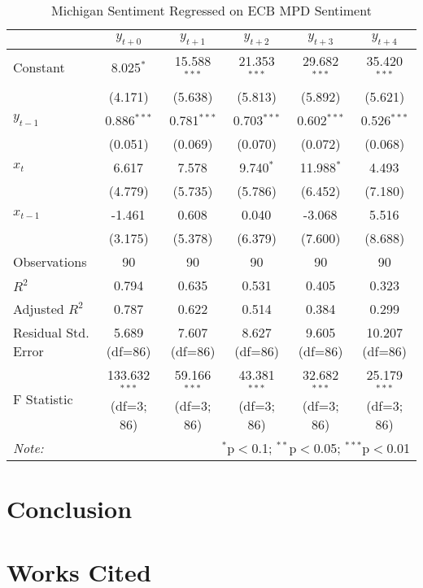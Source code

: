 \documentclass[12pt, letterpaper]{article}
\begin{document}
\begin{table}[H] 
    \centering
  \caption{Michigan Sentiment Regressed on ECB MPD Sentiment}
  \begin{adjustbox}{width=\textwidth}
  \begin{tabular}{lccccc}
  \hline
  \hline
   & $y_{t+0}$ & $y_{t+1}$ & $y_{t+2}$ & $y_{t+3}$ & $y_{t+4}$  \\
  \hline
   Constant & 8.025$^{*}$ & 15.588$^{***}$ & 21.353$^{***}$ & 29.682$^{***}$ & 35.420$^{***}$ \\
  & (4.171) & (5.638) & (5.813) & (5.892) & (5.621) \\
   $y_{t-1}$ & 0.886$^{***}$ & 0.781$^{***}$ & 0.703$^{***}$ & 0.602$^{***}$ & 0.526$^{***}$ \\
  & (0.051) & (0.069) & (0.070) & (0.072) & (0.068) \\
   $x_{t}$ & 6.617$^{}$ & 7.578$^{}$ & 9.740$^{*}$ & 11.988$^{*}$ & 4.493$^{}$ \\
  & (4.779) & (5.735) & (5.786) & (6.452) & (7.180) \\
   $x_{t-1}$ & -1.461$^{}$ & 0.608$^{}$ & 0.040$^{}$ & -3.068$^{}$ & 5.516$^{}$ \\
  & (3.175) & (5.378) & (6.379) & (7.600) & (8.688) \\
  \hline
   Observations & 90 & 90 & 90 & 90 & 90 \\
   $R^2$ & 0.794 & 0.635 & 0.531 & 0.405 & 0.323 \\
   Adjusted $R^2$ & 0.787 & 0.622 & 0.514 & 0.384 & 0.299 \\
   Residual Std. Error & 5.689 (df=86) & 7.607 (df=86) & 8.627 (df=86) & 9.605 (df=86) & 10.207 (df=86) \\
   F Statistic & 133.632$^{***}$ (df=3; 86) & 59.166$^{***}$ (df=3; 86) & 43.381$^{***}$ (df=3; 86) & 32.682$^{***}$ (df=3; 86) & 25.179$^{***}$ (df=3; 86) \\
  \hline
  \hline
  \textit{Note:} & \multicolumn{5}{r}{$^{*}$p$<$0.1; $^{**}$p$<$0.05; $^{***}$p$<$0.01} \\
  \end{tabular}
  \end{adjustbox}
  \end{table}

\section{Conclusion}


\section{Works Cited}
\end{document}

